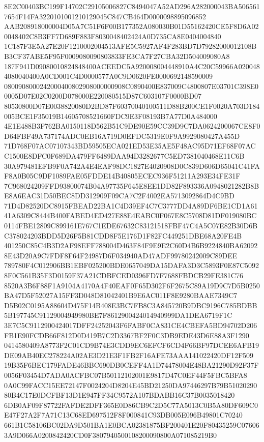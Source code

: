 \documentclass[UTF8,fontset=fandol,zihao=-4,a4paper]{ctexart}
\begin{document}
{{8E2C00403BC199F14702C29105006827C8494047A52AD296A282000043BA5065617654F14FA3220101001210129045C847CB464D0000098895096852
AAB208918000004D05A7C51F6F00B177352A080030B01D55162420CE5F8D6A020048402C8B3FF7D689F883F8030048402424A0D735CA8E0404004840
1C187F3E5A27E20F1210002004513AFE5C5927AF4F283BD7D79282000012108BB3CF37ABE5F95F0009080090803833FE3CA7F27CBA32D504009080A8
187F941D09080010824848400ACEEDC5A920008004448910A4C20C59966A0200484080040400A0CD001C4D0000577A0C9D0620FE0000692148590009
0800908000242000400802908000000908C0890400E837009C4800807E03701C398E00005D07E02C0200D078000E220080515D87C603107F0000BD07
80530800D07E0038820080D2BD87F60370040100511D88B200CE1F0020A703D184005BCE1F35019B14605708521660FDC9E3F08193B7A77D0A484000
4E1E488B3F762BA0150118D562B51C9DE90E59CC39D9C7DA0624200067CE8F0D64FBF49A737174ADC0EB16A719D0EFDC5319E0F9A9929080427A455D
71D768F07AC07107343BD59505ECA021ED53E35AE5F48AC95D71EF68F07ACC1500E8DFC0F689DA479FF6489DAA94D3282677C5ED7381040468E11C6B
30A979481EFB9F0A742A4E4EAF98DC1827E4020908D0C839D606D65041C41FAF8A0B05C9DF1089FAE05FDDE14B40805ECEC936F51211A293E34FE31F
7C968024209FFD93800074B04A97735F645E8EE1DD82F893336A0948021282B8BE8A6EAC31D50BEC8DD312909F09CA7C2F4002EA5713092864D4C9BD
71D4D82520DC8915FBEAD22BA1C4D39EF4C7C3777DD4A89DF6BE1CD1A6141A6309C8444B400FABED4ED427E88E4EABC0F067E8C5708D81DF019080BC
0114FBE12809C899161E767C1EDE67632C83121518FBF47C4A5C07E82B30D6BC378024203BDD5D26F5B81CDD8F5E176D1F82FC449251DBE68A20FE4B
401250C85C4B3D2AF98EFF788004D463F84F9E9E2C60D4B6B9224840BA620928E43D20A9C7FDF8F64F24987D6F034940AD47ADF99780242009C89DEE
789780F4C012906BB1EBF025200BDE0657049DA15DAFA3D3C5893F0E87C50928F0C561B35F3D0159F37A21CDBFCED0396FD7F7688FBDCB29FE381C76
8520A3B6F88F1A9104A4170A4F40EAF0F65D302F6F2675C89A19D9C7D5B0250BA47D5F52027A15FF3D048D81042401B9E6AC011F8E9280BAAE7349C7
D5B02C0195A88604D475F14B408E3BC7FB8C3A845720B9DBC9196C785BDBB5B197745C91129004949980BE7F8612900424014940999DA1DEA6719F1C
3E7C5C9112900424017DFF24252043F6FABF0CA831CE4CBEFA5BD94702D206FB1E90FCDB66F812D0D419B7C2D3367BF2F0C3DB9EDE43D6E88A3F1290
0414580409A8773F2C01CD9B74E3CDD9EC6EFCF6CD4F66BF97DCEE6AFB19DE09AB40EC278224A02AE3D21E3F1FB2F16AFE73AAA141022420DF12F509
19B35F6BEC179FADE46BBC690DB0CEFF4A1D74478004E48BA21290D92F37F0056F03454D7ADA0ACFBC07B50112102001E9817D47C0EF44F5FBC5BFA8
0A0C99FACC15EE72147F0024204D8204E45BD21250DA97446297B79B5102029080B4C17E0DCFBF13D1E947FF34C9572A107BDABB16C37B0035018420
6DB0AF09F87722FAFDE2DFF365E0D86CB9C2D5C77A5013C0B5A80DF609C0E47F27A2F7A71C13C68ED697512F8F000841C93DB005E096B49801C70240
661B1C58106BC02DA9D501BA1E0BCA02381875BF200401E20F80435259C076063A9D066A0200842420CD0F3807940500108200090800A071085219B0
}}
\end{document}
